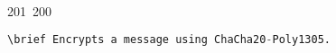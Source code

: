 201~200~\documentclass{article}
\begin{document}
\begin{lstlisting}[language=Python, caption=Encrypting a Message with ChaCha20-Poly1305]
	                                                                                                                                                                                                                                                                                                	                                                                                                                                        	    	                                                                                                	                                                                                                                                                                                                                                                                                                                                	                                                                        	                                                                        	                                                                                                                                        	                                                                                                                                                                                                                        	                                                                                                                            	                                                                	                                                                                                            \brief Encrypts a message using ChaCha20-Poly1305.

\end{lstlisting}
\end{document}
